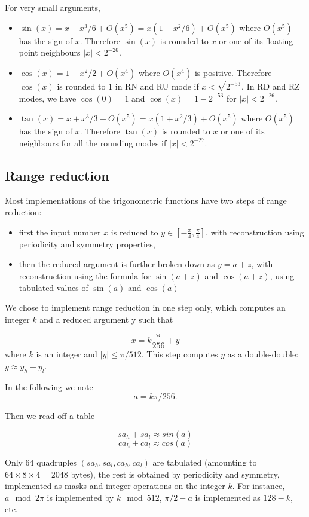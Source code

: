 For very small arguments,
\begin{itemize}
\item $\sin(x) = x-x^3/6 + O(x^5) = x(1-x^2/6) + O(x^5)$ where
  $O(x^5)$ has the sign of $x$. Therefore $\sin(x)$ is rounded to $x$
  or one of its floating-point neighbours $|x|<2^{-26}$.
\item $\cos(x) = 1-x^2/2 + O(x^4)$ where $O(x^4)$ is positive.
  Therefore $\cos(x)$ is rounded to $1$ in RN and RU mode if
  $x<\sqrt{2^{-53}}$. In RD and RZ modes, we have $\cos(0)=1$ and
  $\cos(x)=1-2^{-53}$ for $|x|<2^{-26}$.
\item $\tan(x) = x+x^3/3 + O(x^5) = x(1+x^2/3) + O(x^5)$ where
  $O(x^5)$ has the sign of $x$. Therefore $\tan(x)$ is rounded to $x$
  or one of its neighbours for all the rounding  modes if $|x|<2^{-27}$.
\end{itemize}


\subsection{Range reduction}

Most implementations of the trigonometric functions have two steps of range reduction: 
\begin{itemize}
\item first the input number $x$ is reduced to $y\in
  [-\frac{\pi}{4}, \frac{\pi}{4}]$, with reconstruction using periodicity and
  symmetry properties,
\item then the reduced argument is further broken down as $y=a+z$,
  with reconstruction using the formula for $\sin(a+z)$ and
  $\cos(a+z)$, using tabulated values of $\sin(a)$ and
  $\cos(a)$
\end{itemize}

We chose to implement range reduction in one step only, which
computes an integer $k$ and a reduced argument y such that

\begin{equation}
  x = k\frac{\pi}{256} + y\label{eq:trigoargred}
\end{equation}
where $k$ is an integer and  $ |y| \leq {\pi}/{512}$.
This step computes $y$ as a double-double: $y\approx y_h+y_l$. 

In the following we note $$a=k\pi/256.$$ 

Then we read off a table 

$$sa_h+sa_l \approx sin(a)$$
$$ca_h+ca_l \approx cos(a)$$

Only 64 quadruples $(sa_h,sa_l,ca_h,ca_l)$ are tabulated (amounting to
$64\times 8 \times 4 = 2048$ bytes), the rest is obtained by
periodicity and symmetry, implemented as masks and integer operations
on the integer $k$. For instance,  $a \mod 2\pi$ is implemented by $k \mod 512$,
$\pi/2-a$ is implemented as $128-k$, etc.



